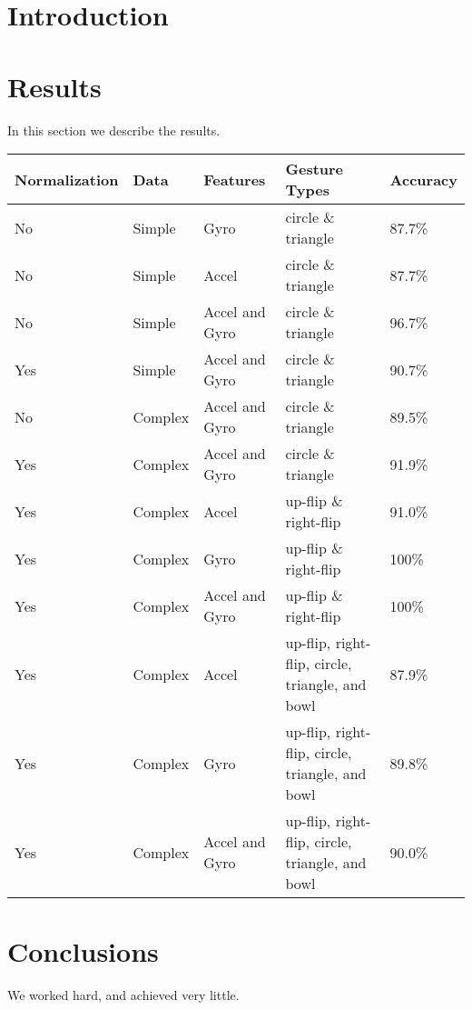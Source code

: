 \documentclass[12pt]{article}
\begin{document}
\maketitle


\section{Introduction}

\section{Results}\label{results}
In this section we describe the results.


\begin{center}
\begin{tabular}{ | l | l | l | l | l | }
  \hline
  Normalization & Data & Features & Gesture Types & Accuracy \\ \hline
  No	&	Simple	&	Gyro	&	circle \& triangle	&	87.7\% \\ \hline
  No	&	Simple	&	Accel	&	circle \& triangle	&	87.7\% \\ \hline
  No	&	Simple	&	Accel and Gyro	&	circle \& triangle	&	96.7\% \\ \hline
  Yes	&	Simple	&	Accel and Gyro	&	circle \& triangle	&	90.7\% \\ \hline
  No	&	Complex	&	Accel and Gyro	&	circle \& triangle	&	89.5\% \\ \hline
  Yes	&	Complex	&	Accel and Gyro	&	circle \& triangle	&	91.9\% \\ \hline
  Yes	&	Complex	&	Accel	&	up-flip \& right-flip	&	91.0\% \\ \hline
  Yes	&	Complex	&	Gyro	&	up-flip \& right-flip	&	100\% \\ \hline
  Yes	&	Complex	&	Accel and Gyro	&	up-flip \& right-flip	&	100\% \\ \hline
  Yes	&	Complex	&	Accel	&	up-flip, right-flip, circle, triangle, and bowl	&	87.9\% \\ \hline
  Yes	&	Complex	&	Gyro	&	up-flip, right-flip, circle, triangle, and bowl	&	89.8\% \\ \hline
  Yes	&	Complex	&	Accel and Gyro	&	up-flip, right-flip, circle, triangle, and bowl	&	90.0\% \\
  \hline
\end{tabular}
\end{center}

\section{Conclusions}\label{conclusions}
We worked hard, and achieved very little.



\end{document}
